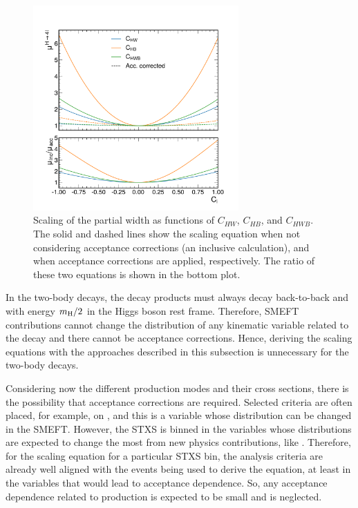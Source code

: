 \begin{figure}
  \centering
  \includegraphics[width=0.7\textwidth]{Figures/EFT/h4l_acc_corr.pdf}
  \caption[Impact of Acceptance Corrections on the \Hfl Partial Width]{Scaling of the \Hfl partial width as functions of $C_{HW}$, $C_{HB}$, and $C_{HWB}$. The solid and dashed lines show the scaling equation when not considering acceptance corrections (an inclusive calculation), and when acceptance corrections are applied, respectively. The ratio of these two equations is shown in the bottom plot.}\label{fig:h4l_acceptance_corrected}
\end{figure}

In the two-body decays, the decay products must always decay back-to-back and with energy $m_{\mathrm{H}} / 2$ in the Higgs boson rest frame. Therefore, SMEFT contributions cannot change the distribution of any kinematic variable related to the decay and there cannot be acceptance corrections. Hence, deriving the scaling equations with the approaches described in this subsection is unnecessary for the two-body decays.

Considering now the different production modes and their cross sections, there is the possibility that acceptance corrections are required. Selected criteria are often placed, for example, on \ptH, and this is a variable whose distribution can be changed in the SMEFT. However, the STXS is binned in the variables whose distributions are expected to change the most from new physics contributions, like \ptH. Therefore, for the scaling equation for a particular STXS bin, the analysis criteria are already well aligned with the events being used to derive the equation, at least in the variables that would lead to acceptance dependence. So, any acceptance dependence related to production is expected to be small and is neglected.

